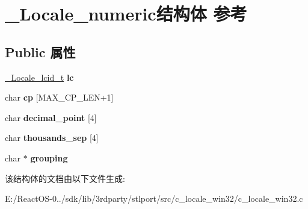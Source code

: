 \hypertarget{struct___locale__numeric}{}\section{\+\_\+\+Locale\+\_\+numeric结构体 参考}
\label{struct___locale__numeric}
\subsection*{Public 属性}
\begin{DoxyCompactItemize}
\item 
\mbox{\label{struct___locale__numeric_a3d52cd208331c94c31a6b3f3c42cadca}} 
\hyperlink{struct___locale__name__hint}{\+\_\+\+Locale\+\_\+lcid\+\_\+t} {\bfseries lc}
\item 
\mbox{\label{struct___locale__numeric_af860c444d86307b1d2323569515a1072}} 
char {\bfseries cp} \mbox{[}M\+A\+X\+\_\+\+C\+P\+\_\+\+L\+EN+1\mbox{]}
\item 
\mbox{\label{struct___locale__numeric_a711a44062cb4909d068baa82f591f7e5}} 
char {\bfseries decimal\+\_\+point} \mbox{[}4\mbox{]}
\item 
\mbox{\label{struct___locale__numeric_aac2d42a4f5fc237433ee0bc50cc27f12}} 
char {\bfseries thousands\+\_\+sep} \mbox{[}4\mbox{]}
\item 
\mbox{\label{struct___locale__numeric_a960c5d77b22d0553ed64d8a9d51bb334}} 
char $\ast$ {\bfseries grouping}
\end{DoxyCompactItemize}


该结构体的文档由以下文件生成\+:\begin{DoxyCompactItemize}
\item 
E\+:/\+React\+O\+S-\/0../sdk/lib/3rdparty/stlport/src/c\+\_\+locale\+\_\+win32/c\+\_\+locale\+\_\+win32.\+c\end{DoxyCompactItemize}
